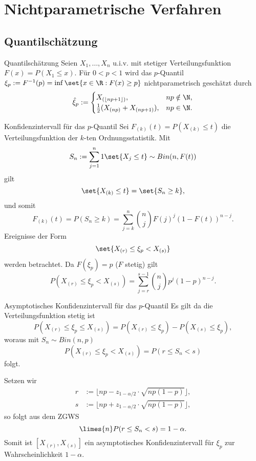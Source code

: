 \section{Nichtparametrische Verfahren}

\subsection{Quantilschätzung}

\begin{karte}{Quantilschätzung}
Seien \(X_1, \ldots, X_n\) u.i.v. mit stetiger Verteilungsfunktion 
\(F(x) = P(X_1\leq x)\). Für \(0<p<1\) wird das \(p\)-Quantil 
\(\xi_p := F^{-1}(p) = \inf \set{ x\in \R: F(x) \geq p }\) 
nichtparametrisch geschätzt durch 
\[ \hat{\xi}_p := \begin{cases}
    X_{(\lfloor np+1 \rfloor)}, & np\notin \N, \\
    \frac{1}{2} (X_{(np)} + X_{(np+1)}), &np\in \N.
\end{cases} \]
\end{karte}

\begin{karte}{Konfidenzintervall für das \(p\)-Quantil}
Sei \(F_{(k)}(t) = P(X_{(k)} \leq t)\) die Verteilungsfunktion 
der \(k\)-ten Ordnungsstatistik. Mit 
\[ S_n := \sum_{j=1}^n 1 \set{X_j \leq t} \sim Bin(n, F(t)) \]
gilt 
\[ \set{X_{(k)} \leq t} = \set{S_n \geq k}, \]
und somit 
\[ F_{(k)}(t) = P(S_n \geq k) = \sum_{j=k}^n \binom{n}{j} F(j)^j (1-F(t))^{n-j}. \]
Ereignisse der Form 
\[ \set{X_{(r)} \leq \xi_p < X_{(s)}} \]
werden betrachtet. 
Da \(F(\xi_p) = p\) (\(F\) stetig) gilt 
\[ P(X_{(r)} \leq \xi_p < X_{(s)}) = \sum_{j=r}^{s-1} \binom{n}{j} p^j (1-p)^{n-j}. \]
\end{karte}

\begin{karte}{Asymptotisches Konfidenzintervall für das \(p\)-Quantil}
Es gilt da die Verteilungsfunktion stetig ist 
\[ P(X_{(r)} \leq \xi_p \leq X_{(s)}) = P(X_{(r)} \leq \xi_p) - P(X_{(s)} \leq \xi_p), \]
woraus mit \(S_n \sim Bin(n,p)\)
\[ P(X_{(r)} \leq \xi_p < X_{(s)}) = P(r\leq S_n < s) \]
folgt.

Setzen wir 
\begin{align*}
    r &:= \lfloor np - z_{1-\alpha/2} \cdot \sqrt{np(1-p)} \rfloor, \\
    s &:= \lfloor np + z_{1-\alpha/2} \cdot \sqrt{np(1-p)} \rfloor,
\end{align*}
so folgt aus dem ZGWS 
\[ \limes{n} P(r \leq S_n < s) = 1-\alpha. \]
Somit ist \( [X_{(r)}, X_{(s)}] \) ein asymptotisches Konfidenzintervall für 
\(\xi_p\) zur Wahrscheinlichkeit \(1-\alpha\).
\end{karte}

